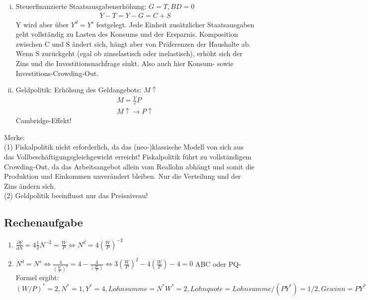 \documentclass{scrartcl}
\begin{document}
\begin{enumerate}
\begin{enumerate}[(i)]
\item Steuerfinanzierte Staatsausgabenerh\"{o}hung: $G=T,BD=0$
\begin{align*}
Y - T = Y-G = C+ S
\end{align*}
Y wird aber \"{u}ber $Y^d=Y^s$ festgelegt. Jede Einheit zus\"{a}tzlicher Staatsausgaben geht vollst\"{a}ndig zu Lasten des Konsums und der Ersparnis. Komposition zwischen C und S \"{a}ndert sich, h\"{a}ngt aber von Pr\"{a}ferenzen der Haushalte ab. Wenn S zur\"{u}ckgeht (egal ob zinselastisch oder inelastisch), erh\"{o}ht sich der Zins und die Investitionsnachfrage sinkt. Also auch hier Konsum- sowie Investitions-Crowding-Out.
\item Geldpolitik: Erh\"{o}hung des Geldangebots: $M\uparrow$
\begin{align*}
M = \frac{Y}{v} P\\
M \uparrow \rightarrow P \uparrow
\end{align*}
Cambridge-Effekt!
\end{enumerate}

Merke:\\
(1) Fiskalpolitik nicht erforderlich, da das (neo-)klassische Modell von sich aus das Vollbesch\"{a}ftigungsgleichgewicht erreicht! Fiskalpolitik f\"{u}hrt zu vollst\"{a}ndigem Crowding-Out, da das Arbeitsangebot allein vom Reallohn abh\"{a}ngt und somit die Produktion und Einkommen unver\"{a}ndert bleiben. Nur die Verteilung und der Zins \"{a}ndern sich.\\
(2) Geldpolitik beeinflusst nur das Preisniveau!
\end{enumerate}
\subsection{Rechenaufgabe}
\begin{enumerate}
\item $\frac{\partial Y}{\partial N} = 4\frac{1}{2}N^{-2}=\frac{W}{P} \Leftrightarrow N^d = 4 \left(\frac{W}{P}\right)^{-2}$
\item $N^d=N^s \Leftrightarrow \frac{4}{\left(\frac{W}{P}\right)^2} = 4 - \frac{4}{\left(\frac{W}{P}\right)} \Leftrightarrow 3\left(\frac{W}{P}\right)^2 - 4 \left(\frac{W}{P}\right) - 4 = 0$ ABC oder PQ-Formel ergibt: $(W/P)^*=2,N^*=1,Y^*=4,Lohnsumme=N^* W^* = 2, Lohnquote = Lohnsumme/(PY^*) = 1/2, Gewinn = PY^* - W^*N^* = 2$
\end{enumerate}
\end{document}
